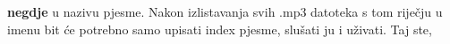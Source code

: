 \documentclass{exam}
\begin{document}
                                                                                            \textbf{negdje}
                                                                                            u
                                                                                            nazivu
                                                                                            pjesme.
                                                                                            Nakon
                                                                                            izlistavanja
                                                                                            svih
                                                                                            .mp3
                                                                                            datoteka
                                                                                            s
                                                                                            tom
                                                                                            riječju
                                                                                            u
                                                                                            imenu
                                                                                            bit
                                                                                            će
                                                                                            potrebno
                                                                                            samo
                                                                                            upisati
                                                                                            index
                                                                                            pjesme,
                                                                                            slušati
                                                                                            ju
                                                                                            i
                                                                                            uživati.
                                                                                            Taj
                                                                                            ste,
\end{document}
